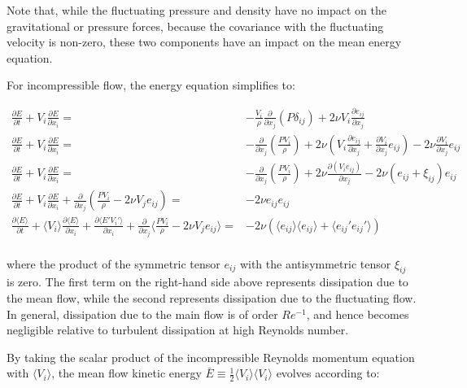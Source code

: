 \documentclass[10pt]{article}
\newcommand{\beqa}{\begin{equation}\begin{aligned}}
\newcommand{\eeqa}{\end{aligned}\end{equation}}
\newcommand{\la}{\langle}
\newcommand{\ra}{\rangle}
\newcounter{subsubsubsection}[subsubsection]
\begin{document}
\begin{flushleft}
Note that, while the fluctuating pressure and density have no impact on the gravitational or pressure forces, because the covariance with the fluctuating velocity is non-zero, these two components have an impact on the mean energy equation. 



For incompressible flow, the energy equation simplifies to:

\beqa
\frac{\partial E}{\partial t}+V_i\frac{\partial E}{\partial x_i}=&-\frac{V_i}{\rho}\frac{\partial}{\partial x_j}(P\delta_{ij})+2\nu V_i\frac{\partial e_{ij}}{\partial x_j}\\
\frac{\partial E}{\partial t}+V_i\frac{\partial E}{\partial x_i}=&-\frac{\partial}{\partial x_j}\left(\frac{PV_i}{\rho}\right)+2\nu\left(V_i\frac{\partial e_{ij}}{\partial x_j}+\frac{\partial V_i}{\partial x_j}e_{ij}\right)-2\nu\frac{\partial V_i}{\partial x_j}e_{ij}\\
\frac{\partial E}{\partial t}+V_i\frac{\partial E}{\partial x_i}=&-\frac{\partial}{\partial x_j}\left(\frac{PV_i}{\rho}\right)+2\nu\frac{\partial (V_ie_{ij})}{\partial x_j}-2\nu(e_{ij}+\xi_{ij})e_{ij}\\
\frac{\partial E}{\partial t}+V_i\frac{\partial E}{\partial x_i}+\frac{\partial}{\partial x_j}\left(\frac{PV_i}{\rho}-2\nu V_je_{ij}\right)=&-2\nu e_{ij}e_{ij}\\
\frac{\partial \la E\ra}{\partial t}+\la V_i\ra\frac{\partial \la E\ra}{\partial x_i}+\frac{\partial \la E'V_i'\ra}{\partial x_i}+\frac{\partial}{\partial x_j}\la\frac{PV_i}{\rho}-2\nu V_je_{ij}\ra=&-2\nu \left(\la e_{ij}\ra\la e_{ij}\ra+\la e_{ij}'e_{ij}'\ra\right)\\
\eeqa

where the product of the symmetric tensor \(e_{ij}\) with the antisymmetric tensor \(\xi_{ij}\) is zero. The first term on the right-hand side above represents dissipation due to the mean flow, while the second represents dissipation due to the fluctuating flow. In general, dissipation due to the main flow is of order \(Re^{-1}\), and hence becomes negligible relative to turbulent dissipation at high Reynolds number. 


By taking the scalar product of the incompressible Reynolds momentum equation with \(\la V_i\ra\), the mean flow kinetic energy \(\bar{E}\equiv\frac{1}{2}\la V_i\ra\la V_i\ra\) evolves according to:


\end{flushleft}
\end{document}
